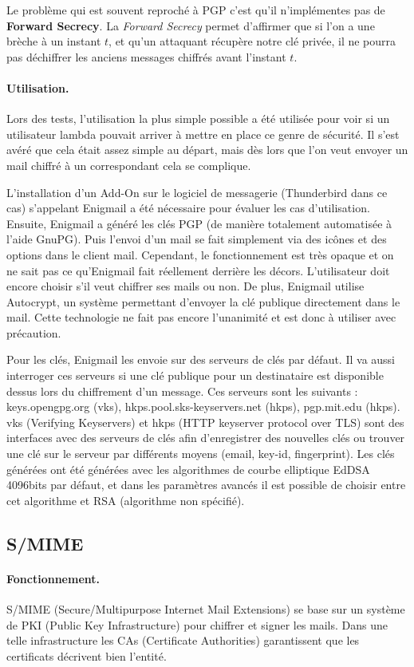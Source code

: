 Le problème qui est souvent reproché à PGP c'est qu'il n'implémentes pas de \textbf{Forward Secrecy}. La \textit{Forward Secrecy} permet d'affirmer que si l'on a une brèche à un instant $t$, et qu'un attaquant récupère notre clé privée, il ne pourra pas déchiffrer les anciens messages chiffrés avant l'instant $t$.
\paragraph*{Utilisation.}
Lors des tests, l’utilisation la plus simple possible a été utilisée pour voir si un utilisateur lambda pouvait arriver à mettre en place ce genre de sécurité. Il s’est avéré que cela était assez simple au départ, mais dès lors que l'on veut envoyer un mail chiffré à un correspondant cela se complique.

L'installation d'un Add-On sur le logiciel de messagerie (Thunderbird dans ce cas) s’appelant Enigmail a été nécessaire pour évaluer les cas d'utilisation. Ensuite, Enigmail a généré les clés PGP (de manière totalement automatisée à l'aide GnuPG). Puis l'envoi d'un mail se fait simplement via des icônes et des options dans le client mail. Cependant, le fonctionnement est très opaque et on ne sait pas ce qu'Enigmail fait réellement derrière les décors. L’utilisateur doit encore choisir s’il veut chiffrer ses mails ou non. De plus, Enigmail utilise Autocrypt, un système permettant d'envoyer la clé publique directement dans le mail. Cette technologie ne fait pas encore l'unanimité et est donc à utiliser avec précaution.
 
Pour les clés, Enigmail les envoie sur des serveurs de clés par défaut. Il va aussi interroger ces serveurs si une clé publique pour un destinataire est disponible dessus lors du chiffrement d'un message. Ces serveurs sont les suivants : keys.opengpg.org (vks), hkps.pool.sks-keyservers.net (hkps), pgp.mit.edu (hkps). vks (Verifying Keyservers) et hkps (HTTP keyserver protocol over TLS) sont des interfaces avec des serveurs de clés afin d'enregistrer des nouvelles clés ou trouver une clé sur le serveur par différents moyens (email, key-id, fingerprint). Les clés générées ont été générées avec les algorithmes de courbe elliptique EdDSA 4096bits par défaut, et dans les paramètres avancés il est possible de choisir entre cet algorithme et RSA (algorithme non spécifié).
\subsection{S/MIME}
\label{protocols:SMIME}
\paragraph*{Fonctionnement.}
S/MIME (Secure/Multipurpose Internet Mail Extensions) se base sur un système de PKI (Public Key Infrastructure) pour chiffrer et signer les mails. Dans une telle infrastructure les CAs (Certificate Authorities) garantissent que les certificats décrivent bien l'entité.

